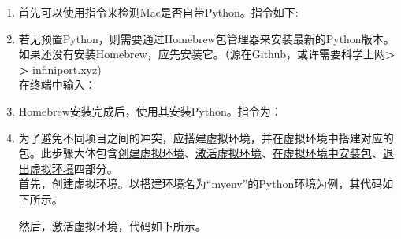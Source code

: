 \documentclass{article}
\begin{document}
			\begin{enumerate}
				\item 首先可以使用指令来检测Mac是否自带Python。指令如下:
				\begin{center}
				\end{center}
				
				\item 若无预置Python，则需要通过Homebrew包管理器来安装最新的Python版本。如果还没有安装Homebrew，应先安装它。（源在Github，或许需要科学上网\textbf{> >} \underline{infiniport.xyz})\\
				在终端中输入：
				\begin{center}
				\end{center}
				
			\item Homebrew安装完成后，使用其安装Python。指令为：
			\begin{center}
			\end{center}
			
			\item 为了避免不同项目之间的冲突，应搭建虚拟环境，并在虚拟环境中搭建对应的包。此步骤大体包含\underline{创建虚拟环境}、\underline{激活虚拟环境}、\underline{在虚拟环境中安装包}、\underline{退出虚拟环境}四部分。\\
			首先，创建虚拟环境。以搭建环境名为“myenv”的Python环境为例，其代码如下所示。
			\begin{center}
			\end{center}
			
			然后，激活虚拟环境，代码如下所示。
			\begin{center}
			\end{center}
			

\end{enumerate}
\end{document}
